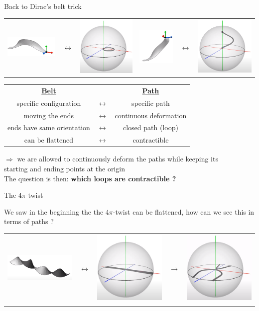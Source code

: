 \documentclass[10pt]{beamer}
\renewcommand{\emph}{\alert}
\begin{document}
\begin{frame}{Back to Dirac's belt trick}
    \begin{center}
    \begin{tabular}{m{2cm} m{0.5cm} m{2cm} m{2cm} m{0.5cm} m{2cm}}
        \includegraphics[scale=0.1]{Pictures/contractiblepathbelt.png} & $\longleftrightarrow$ & \includegraphics[scale=0.08]{Pictures/contractiblepathsphere.png} & \includegraphics[scale=0.1]{Pictures/noncontractiblepathbelt.png} & $\longleftrightarrow$ & \includegraphics[scale=0.08]{Pictures/noncontractiblepathsphere.png}
    \end{tabular}
    \end{center}
    \begin{center}
    \begin{tabular}{|ccc|}
        \hline
        \textbf{\underline{Belt}} & & \textbf{\underline{Path}} \\[0.2cm]
        specific configuration & $\longleftrightarrow$ & specific path \\[0.2cm]
        moving the ends & $\longleftrightarrow$ & continuous deformation  \\[0.2cm]
        ends have same orientation & $\longleftrightarrow$ & closed path (loop) \\[0.2cm]
        \emph{can be flattened} & $\longleftrightarrow$ & \emph{contractible} \\ \hline
    \end{tabular}
    \end{center}
    $\Rightarrow$ we are allowed to continuously deform the paths while keeping its \\ \hspace{0.4cm} starting and ending points at the origin \\[0.3cm]
    The question is then: \textbf{which loops are contractible ?}
\end{frame}

\begin{frame}{The $4\pi$-twist}
    
    We saw in the beginning the the $4\pi$-twist can be flattened, how can we see this in terms of paths ?
    \begin{center}
        \begin{tabular}{m{2cm} m{0.5cm} m{2cm} m{0.5cm} m{2cm}}
            \includegraphics[scale=0.1]{Pictures/4pibelt.png} & $\longleftrightarrow$ & \includegraphics[scale=0.09]{Pictures/4pisphere1.png} & $\longrightarrow$ &  \includegraphics[scale=0.09]{Pictures/4pisphere2.png} \\
            & & &
\end{tabular}
\end{center}
\end{frame}
\end{document}
